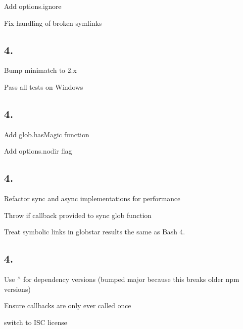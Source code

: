 \begin{DoxyItemize}
\item Add {\ttfamily options.\+ignore}
\item Fix handling of broken symlinks
\end{DoxyItemize}

\subsection*{4.}


\begin{DoxyItemize}
\item Bump minimatch to 2.\+x
\item Pass all tests on Windows
\end{DoxyItemize}

\subsection*{4.}


\begin{DoxyItemize}
\item Add {\ttfamily glob.\+has\+Magic} function
\item Add {\ttfamily options.\+nodir} flag
\end{DoxyItemize}

\subsection*{4.}


\begin{DoxyItemize}
\item Refactor sync and async implementations for performance
\item Throw if callback provided to sync glob function
\item Treat symbolic links in globstar results the same as Bash 4.
\end{DoxyItemize}

\subsection*{4.}


\begin{DoxyItemize}
\item Use {\ttfamily $^\wedge$} for dependency versions (bumped major because this breaks older npm versions)
\item Ensure callbacks are only ever called once
\item switch to I\+SC license
\end{DoxyItemize}

